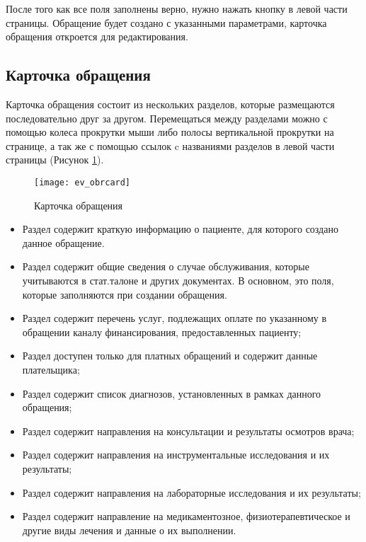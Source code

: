 После того как все поля заполнены верно, нужно нажать кнопку  в левой части страницы. Обращение будет создано с указанными параметрами, карточка обращения откроется для редактирования.

\subsection{Карточка обращения} \label{ev_obr}

Карточка обращения состоит из нескольких разделов, которые размещаются последовательно друг за другом. Перемещаться  между разделами можно с помощью колеса прокрутки мыши либо полосы вертикальной прокрутки на странице, а так же с помощью ссылок c названиями разделов в левой части страницы (Рисунок \ref{img_ev_obrcard}). 

\begin{figure}[!ht]\centering
	\texttt{[image: ev\_obrcard]}
	\caption{Карточка обращения}
	\label{img_ev_obrcard}
\end{figure}

\begin{itemize}
 \item Раздел  содержит краткую информацию о пациенте, для которого создано данное обращение. 
 \item Раздел  содержит общие сведения о случае обслуживания, которые учитываются в стат.талоне и других документах. В основном, это поля, которые заполняются при создании обращения.
 \item Раздел  содержит перечень услуг, подлежащих оплате по указанному в обращении каналу финансирования, предоставленных пациенту;
 \item Раздел  доступен только для платных обращений и содержит данные плательщика;
 \item Раздел  содержит список диагнозов, установленных в рамках данного обращения;
 \item Раздел  содержит направления на консультации и результаты осмотров врача;
 \item Раздел  содержит направления на инструментальные исследования и их результаты;
 \item Раздел  содержит направления на лабораторные исследования и их результаты;
 \item Раздел  содержит направление на медикаментозное, физиотерапевтическое и другие виды лечения и данные о их выполнении.
\end{itemize}
 
